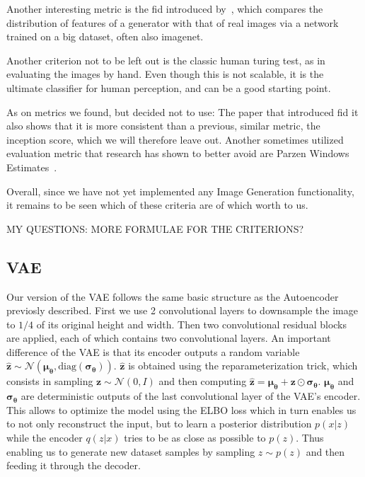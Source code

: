 Another interesting metric is the \ac{fid} introduced by~\cite{fid}, which compares the distribution of features of
a generator with that of real images via a network trained on a big dataset, often also imagenet.

Another criterion not to be left out is the classic human turing test, as in evaluating the images by hand.
Even though this is not scalable, it is the ultimate classifier for human perception, and can be a good starting
point.

As on metrics we found, but decided not to use: The paper that introduced \ac{fid} it also shows that it is more
consistent than a previous, similar metric, the inception score, which we will therefore leave out.
Another sometimes utilized evaluation metric that research has shown to better avoid are Parzen Windows Estimates~\cite{note_on_eval}.

Overall, since we have not yet implemented any Image Generation functionality, it remains to be seen which of these
criteria are of which worth to us.

MY QUESTIONS: MORE FORMULAE FOR THE CRITERIONS?

\subsection{VAE}
Our version of the VAE follows the same basic structure as the Autoencoder
previosly described. First we use 2 convolutional layers to downsample the
image to $1/4$ of its original height and width. Then two convolutional
residual blocks are applied, each of which contains two convolutional layers.
An important difference of the VAE is that its encoder outputs a random
variable $\boldsymbol{\hat{z}} \sim \mathcal{N}(\boldsymbol{\mu_\theta}, \text{diag}
(\boldsymbol{\sigma_\theta}))$. $\boldsymbol{\hat{z}}$ is obtained using the
reparameterization trick, which consists in sampling $\boldsymbol{z}
\sim \mathcal{N}(0, I)$ and then computing $\boldsymbol{\hat{z}} =
\boldsymbol{\mu_\theta} + \boldsymbol{z} \odot \boldsymbol{\sigma_\theta}$.
$\boldsymbol{\mu_\theta}$ and $\boldsymbol{\sigma_\theta}$ are deterministic
outputs of the last convolutional layer of the VAE's encoder. This allows to
optimize the model using the ELBO loss which in turn enables us to not only
reconstruct the input, but to learn a posterior distribution $p(x|z)$ while
the encoder $q(z|x)$ tries to be as close as possible to $p(z)$. Thus enabling
us to generate new dataset samples by sampling $z \sim p(z)$ and then feeding
it through the decoder.

